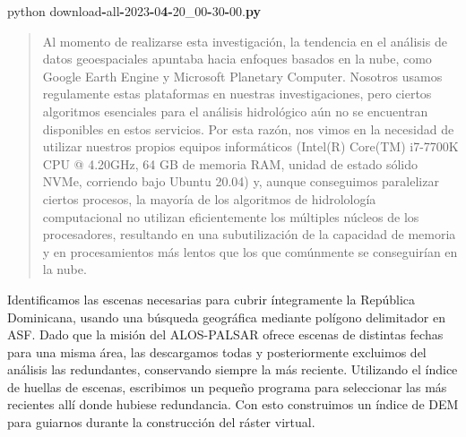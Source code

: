 \documentclass[spanish]{article}
\newenvironment{Shaded}{\begin{snugshade}}{\end{snugshade}}
\newcommand{\BuiltInTok}[1]{#1}
\newcommand{\DecValTok}[1]{\textcolor[rgb]{0.00,0.00,0.81}{#1}}
\newcommand{\ErrorTok}[1]{\textcolor[rgb]{0.64,0.00,0.00}{\textbf{#1}}}
\newcommand{\FloatTok}[1]{\textcolor[rgb]{0.00,0.00,0.81}{#1}}
\newcommand{\NormalTok}[1]{#1}
\newcommand{\OperatorTok}[1]{\textcolor[rgb]{0.81,0.36,0.00}{\textbf{#1}}}
\begin{document}
\begin{Shaded}
\begin{Highlighting}[]
\NormalTok{python download}\OperatorTok{{-}}\BuiltInTok{all}\OperatorTok{{-}}\DecValTok{2023}\OperatorTok{{-}}\DecValTok{0}\ErrorTok{4}\OperatorTok{{-}}\DecValTok{20\_00}\OperatorTok{{-}}\DecValTok{30}\OperatorTok{{-}}\FloatTok{00.}\ErrorTok{py}
\end{Highlighting}
\end{Shaded}

\begin{quote}
Al momento de realizarse esta investigación, la tendencia en el análisis
de datos geoespaciales apuntaba hacia enfoques basados en la nube, como
Google Earth Engine y Microsoft Planetary Computer. Nosotros usamos
regulamente estas plataformas en nuestras investigaciones, pero ciertos
algoritmos esenciales para el análisis hidrológico aún no se encuentran
disponibles en estos servicios. Por esta razón, nos vimos en la
necesidad de utilizar nuestros propios equipos informáticos (Intel(R)
Core(TM) i7-7700K CPU @ 4.20GHz, 64 GB de memoria RAM, unidad de estado
sólido NVMe, corriendo bajo Ubuntu 20.04) y, aunque conseguimos
paralelizar ciertos procesos, la mayoría de los algoritmos de
hidrolología computacional no utilizan eficientemente los múltiples
núcleos de los procesadores, resultando en una subutilización de la
capacidad de memoria y en procesamientos más lentos que los que
comúnmente se conseguirían en la nube.
\end{quote}

Identificamos las escenas necesarias para cubrir íntegramente la
República Dominicana, usando una búsqueda geográfica mediante polígono
delimitador en ASF. Dado que la misión del ALOS-PALSAR ofrece escenas de
distintas fechas para una misma área, las descargamos todas y
posteriormente excluimos del análisis las redundantes, conservando
siempre la más reciente. Utilizando el índice de huellas de escenas,
escribimos un pequeño programa para seleccionar las más recientes allí
donde hubiese redundancia. Con esto construimos un índice de DEM para
guiarnos durante la construcción del ráster virtual.
\end{document}
